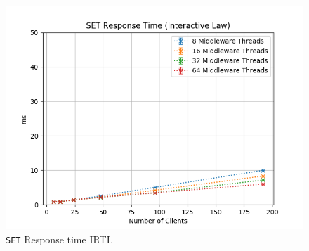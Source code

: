 \documentclass[11pt,a4paper]{article}
\begin{document}
%
\begin{figure}[H]
	\centering
    \begin{minipage}{0.5\textwidth}
        \includegraphics[width=\textwidth]{../illustrations/plots/2_2_two_middlewares/1-0/middleware_interactive_set_rt_ms.png}
        \caption{\texttt{SET} Response time IRTL}
        \label{fig:two_middlewares_set_rt_it}
    \end{minipage}\hfill
\end{figure}
%
\end{document}
